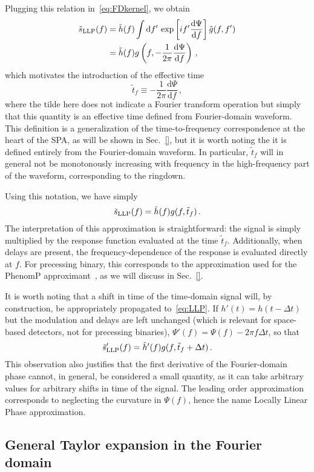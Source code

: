\documentclass[aps,showpacs,%
prd,superscriptaddress,nofootinbib]{revtex4}
\newcommand{\be}{\begin{equation}}
\newcommand{\ee}{\end{equation}}
\newcommand\ud{{\mathrm{d}}}
\newcommand{\nn}{\nonumber}
\newcommand{\tf}{\tilde{t}_{f}}
\begin{document}
Plugging this relation in~\eqref{eq:FDkernel}, we obtain
%
\begin{align}
	\tilde{s}_{\rm LLP}(f) &= \tilde{h}(f) \int \ud f' \, \exp\left[ i f' \frac{\ud \Psi}{\ud f} \right] \tilde{g}(f,f') \nn\\
	&= \tilde{h}(f) g\left( f, -\frac{1}{2\pi} \frac{\ud \Psi}{\ud f} \right) \,,
\end{align}
%
which motivates the introduction of the effective time
%
\be\label{eq:deftf}
	\tf \equiv -\frac{1}{2\pi} \frac{\ud \Psi}{\ud f} \,,
\ee
%
where the tilde here does not indicate  a Fourier transform operation but simply that this quantity is an effective time defined from Fourier-domain waveform. This definition is a generalization of the time-to-frequency correspondence at the heart of the SPA, as will be shown in Sec.~\ref{}, but it is worth noting the it is defined entirely from the Fourier-domain waveform. In particular, $\tf$ will in general not be monotonously increasing with frequency in the high-frequency part of the waveform, corresponding to the ringdown.

Using this notation, we have simply
%
\be\label{eq:LLP}
	\tilde{s}_{\rm LLP}(f) = \tilde{h}(f) g(f, \tf) \,.
\ee
%
The interpretation of this approximation is straightforward: the signal is simply multiplied by the response function evaluated at the time $\tf$. Additionally, when delays are present, the frequency-dependence of the response is evaluated directly at $f$. For precessing binary, this corresponds to the approximation used for the PhenomP approximant~\cite{}, as we will discuss in Sec.~\ref{}.

It is worth noting that a shift in time of the time-domain signal will, by construction, be appropriately propagated to~\eqref{eq:LLP}. If $h'(t) = h(t -  \Delta t)$ but the modulation and delays are left unchanged (which is relevant for space-based detectors, not for precessing binaries), $\Psi'(f) = \Psi(f) - 2\pi f \Delta t$, so that
%
\be\label{eq:LLP}
	\tilde{s}'_{\rm LLP}(f) = \tilde{h}'(f) g(f, \tf + \Delta t) \,. 
\ee
%
This observation also justifies that the first derivative of the Fourier-domain phase cannot, in general, be considered a small quantity, as it can take arbitrary values for arbitrary shifts in time of the signal. The leading order approximation corresponds to neglecting the curvature in $\Psi(f)$, hence the name Locally Linear Phase approximation.


\subsection{General Taylor expansion in the Fourier domain}
\label{subsec:TaylorFD}
\end{document}
